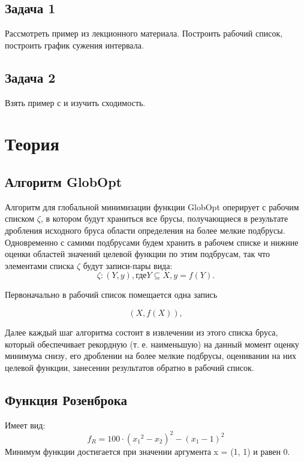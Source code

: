 \documentclass[12pt,a4paper]{scrartcl}
\begin{document}
\subsection{Задача 1}
Рассмотреть пример из лекционного материала. Построить рабочий список, построить график сужения интервала.


\subsection{Задача 2}
Взять пример с \cite{test_opt} и изучить сходимость.

\section {Теория}


\subsection{Алгоритм GlobOpt}
	Алгоритм для глобальной минимизации функции GlobOpt оперирует с рабочим списком $\zeta$, в котором будут храниться все брусы, получающиеся в результате дробления исходного бруса области
    определения на более мелкие подбрусы.
    \newline
    Одновременно с самими
    подбрусами будем хранить в рабочем списке и нижние оценки областей значений целевой функции по этим подбрусам, так что элементами списка $\zeta$ будут записи-пары вида:
    \begin{equation}
        \zeta: (Y, y), \text{где} Y  \subseteq X, y = f(Y).
    \end{equation}

	Первоначально в рабочий список помещается одна запись
	
	\begin{equation}
		(X, f(X)),
	\end{equation}

	Далее каждый шаг алгоритма состоит в извлечении из этого списка
    бруса, который обеспечивает рекордную (т. е. наименьшую) на данный
    момент оценку минимума снизу, его дроблении на более мелкие
    подбрусы, оценивании на них целевой функции, занесении результатов
    обратно в рабочий список.
    
    \subsection{Функция Розенброка}
	Имеет вид:
	\begin{equation}
	    f_{R} = 100 \cdot ({x_1}^2 - x_2)^2 - (x_1 - 1)^2
	    \label{rozen}
	\end{equation}
	Минимум функции достигается при значении аргумента x = (1, 1) и равен 0.
\end{document}

